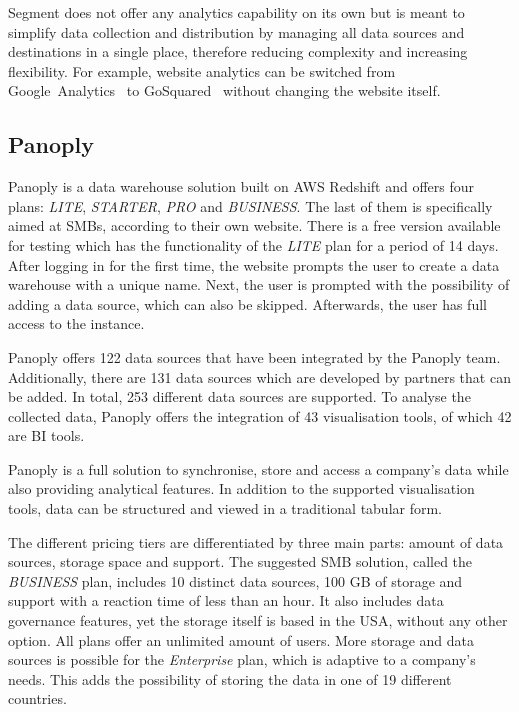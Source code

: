 \documentclass[../paper.tex]{subfiles}
\begin{document}
Segment does not offer any analytics capability on its own but is meant to
simplify data collection and distribution by managing all data sources and
destinations in a single place, therefore reducing complexity and increasing
flexibility. For example, website analytics can be switched from
Google~Analytics~\cite{google_analytics} to GoSquared~\cite{gosquared} without
changing the website itself.

\subsection{Panoply}

Panoply is a data warehouse solution built on AWS Redshift and offers four
plans: \textit{LITE}, \textit{STARTER}, \textit{PRO} and \textit{BUSINESS}. The
last of them is specifically aimed at SMBs, according to their own website.
There is a free version available for testing which has the functionality of
the \textit{LITE} plan for a period of 14 days. After logging in for the first
time, the website prompts the user to create a data warehouse with a unique
name. Next, the user is prompted with the possibility of adding a data source,
which can also be skipped. Afterwards, the user has full access to the
instance.

Panoply offers 122 data sources that have been integrated by the Panoply team.
Additionally, there are 131 data sources which are developed by partners that
can be added. In total, 253 different data sources are supported. To analyse
the collected data, Panoply offers the integration of 43 visualisation tools,
of which 42 are BI tools.

Panoply is a full solution to synchronise, store and access a company's data
while also providing analytical features. In addition to the supported
visualisation tools, data can be structured and viewed in a traditional tabular
form.

The different pricing tiers are differentiated by three main parts: amount of
data sources, storage space and support. The suggested SMB solution, called the
\textit{BUSINESS} plan, includes 10 distinct data sources, 100 GB of storage
and support with a reaction time of less than an hour. It also includes data
governance features, yet the storage itself is based in the USA, without any
other option. All plans offer an unlimited amount of users. More storage and
data sources is possible for the \textit{Enterprise} plan, which is adaptive to
a company's needs. This adds the possibility of storing the data in one of 19
different countries.
\end{document}
